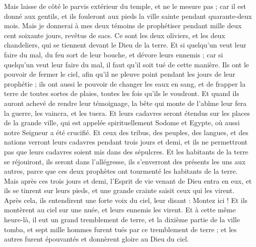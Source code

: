 \begin{multicols}{2}
Mais laisse de côté le parvis extérieur du temple, et ne le mesure pas ; car il est donné aux gentils, et ils fouleront aux pieds la ville sainte pendant quarante-deux mois{}.
Mais je donnerai à mes deux témoins de prophétiser pendant mille deux cent soixante jours, revêtus de sacs.
Ce sont les deux oliviers{}, et les deux chandeliers, qui se tiennent devant le Dieu de la terre. 
Et si quelqu'un veut leur faire du mal, du feu sort de leur bouche, et dévore leurs ennemis ; car si quelqu'un veut leur faire du mal, il faut qu'il soit tué de cette manière.
Ils ont le pouvoir de fermer le ciel, afin qu'il ne pleuve point pendant les jours de leur prophétie ; ils ont aussi le pouvoir de changer les eaux en sang, et de frapper la terre de toutes sortes de plaies, toutes les fois qu'ils le voudront.
Et quand ils auront achevé de rendre leur témoignage, la bête qui monte de l'abîme{} leur fera la guerre, les vaincra, et les tuera.
Et leurs cadavres seront étendus sur les places de la grande ville, qui est appelée spirituellement Sodome et Egypte, où aussi notre Seigneur a été crucifié.
Et ceux des tribus, des peuples, des langues, et des nations verront leurs cadavres pendant trois jours et demi, et ils ne permettront pas que leurs cadavres soient mis dans des sépulcres.
Et les habitants de la terre se réjouiront, ils seront dans l’allégresse, ils s'enverront des présents les uns aux autres, parce que ces deux prophètes ont tourmenté les habitants de la terre.
Mais après ces trois jours et demi, l'Esprit de vie venant de Dieu entra en eux, et ils se tinrent sur leurs pieds, et une grande crainte saisit ceux qui les virent.
Après cela, ils entendirent une forte voix du ciel, leur disant : Montez ici ! Et ils montèrent au ciel sur une nuée, et leurs ennemis les virent.
Et à cette même heure-là, il eut un grand tremblement de terre, et la dixième partie de la ville tomba, et sept mille hommes furent tués par ce tremblement de terre ; et les autres furent épouvantés et donnèrent gloire au Dieu du ciel.

\end{multicols}
